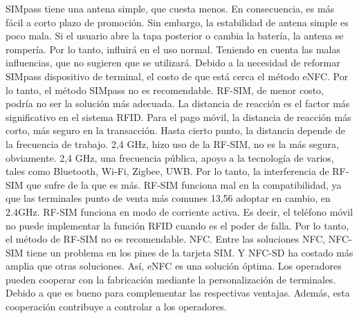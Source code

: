   

SIMpass tiene una antena simple, que cuesta menos. En consecuencia, es más fácil a corto plazo de promoción. Sin embargo, la estabilidad de antena simple es poco mala. Si el usuario abre la tapa posterior o cambia la batería, la antena se rompería. Por lo tanto, influirá en el uso normal. Teniendo en cuenta las malas influencias, que no sugieren que se utilizará. Debido a la necesidad de reformar SIMpass dispositivo de terminal, el costo de que está cerca el método eNFC. Por lo tanto, el método SIMpass no es recomendable. RF-SIM, de menor costo, podría no ser la solución más adecuada. La distancia de reacción es el factor más significativo en el sistema RFID.
Para el pago móvil, la distancia de reacción más corto, más seguro en la transacción. Hasta cierto punto, la distancia depende de la frecuencia de trabajo. 2,4 GHz, hizo uso de la RF-SIM, no es la más segura, obviamente. 2,4 GHz, una frecuencia pública, apoyo a la tecnología de varios, tales como Bluetooth, Wi-Fi, Zigbee, UWB.
Por lo tanto, la interferencia de RF-SIM que sufre de la que es más. RF-SIM funciona mal en la compatibilidad, ya que las terminales punto de venta más comunes 13,56 adoptar en cambio, en 2.4GHz. RF-SIM funciona en modo de corriente activa. Es decir, el teléfono móvil no puede implementar la función RFID cuando es el poder de falla. Por lo tanto, el método de RF-SIM no es recomendable.
NFC. Entre las soluciones NFC, NFC-SIM tiene un problema en los pines de la tarjeta SIM. Y NFC-SD ha costado más amplia que otras soluciones. Así, eNFC es una solución óptima. Los operadores pueden cooperar con la fabricación mediante la personalización de terminales. Debido a que es bueno para complementar las respectivas ventajas. Además, esta cooperación contribuye a controlar a los operadores.



